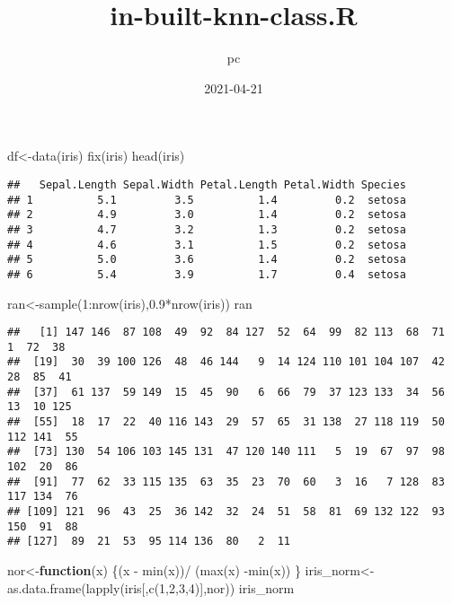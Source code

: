 \documentclass[
]{article}
\title{in-built-knn-class.R}
\author{pc}
\date{2021-04-21}
\newenvironment{Shaded}{\begin{snugshade}}{\end{snugshade}}
\newcommand{\ControlFlowTok}[1]{\textcolor[rgb]{0.13,0.29,0.53}{\textbf{#1}}}
\newcommand{\DecValTok}[1]{\textcolor[rgb]{0.00,0.00,0.81}{#1}}
\newcommand{\FloatTok}[1]{\textcolor[rgb]{0.00,0.00,0.81}{#1}}
\newcommand{\FunctionTok}[1]{\textcolor[rgb]{0.00,0.00,0.00}{#1}}
\newcommand{\NormalTok}[1]{#1}
\newcommand{\OtherTok}[1]{\textcolor[rgb]{0.56,0.35,0.01}{#1}}
\newcommand{\SpecialCharTok}[1]{\textcolor[rgb]{0.00,0.00,0.00}{#1}}
\begin{document}
\maketitle

\begin{Shaded}
\begin{Highlighting}[]
\NormalTok{df}\OtherTok{\textless{}{-}}\FunctionTok{data}\NormalTok{(iris)}
\FunctionTok{fix}\NormalTok{(iris)}
\FunctionTok{head}\NormalTok{(iris)}
\end{Highlighting}
\end{Shaded}

\begin{verbatim}
##   Sepal.Length Sepal.Width Petal.Length Petal.Width Species
## 1          5.1         3.5          1.4         0.2  setosa
## 2          4.9         3.0          1.4         0.2  setosa
## 3          4.7         3.2          1.3         0.2  setosa
## 4          4.6         3.1          1.5         0.2  setosa
## 5          5.0         3.6          1.4         0.2  setosa
## 6          5.4         3.9          1.7         0.4  setosa
\end{verbatim}

\begin{Shaded}
\begin{Highlighting}[]
\NormalTok{ran}\OtherTok{\textless{}{-}}\FunctionTok{sample}\NormalTok{(}\DecValTok{1}\SpecialCharTok{:}\FunctionTok{nrow}\NormalTok{(iris),}\FloatTok{0.9}\SpecialCharTok{*}\FunctionTok{nrow}\NormalTok{(iris))}
\NormalTok{ran}
\end{Highlighting}
\end{Shaded}

\begin{verbatim}
##   [1] 147 146  87 108  49  92  84 127  52  64  99  82 113  68  71   1  72  38
##  [19]  30  39 100 126  48  46 144   9  14 124 110 101 104 107  42  28  85  41
##  [37]  61 137  59 149  15  45  90   6  66  79  37 123 133  34  56  13  10 125
##  [55]  18  17  22  40 116 143  29  57  65  31 138  27 118 119  50 112 141  55
##  [73] 130  54 106 103 145 131  47 120 140 111   5  19  67  97  98 102  20  86
##  [91]  77  62  33 115 135  63  35  23  70  60   3  16   7 128  83 117 134  76
## [109] 121  96  43  25  36 142  32  24  51  58  81  69 132 122  93 150  91  88
## [127]  89  21  53  95 114 136  80   2  11
\end{verbatim}

\begin{Shaded}
\begin{Highlighting}[]
\NormalTok{nor}\OtherTok{\textless{}{-}}\ControlFlowTok{function}\NormalTok{(x) \{(x }\SpecialCharTok{{-}} \FunctionTok{min}\NormalTok{(x))}\SpecialCharTok{/}\NormalTok{ (}\FunctionTok{max}\NormalTok{(x) }\SpecialCharTok{{-}}\FunctionTok{min}\NormalTok{(x)) \}}
\NormalTok{iris\_norm}\OtherTok{\textless{}{-}}\FunctionTok{as.data.frame}\NormalTok{(}\FunctionTok{lapply}\NormalTok{(iris[,}\FunctionTok{c}\NormalTok{(}\DecValTok{1}\NormalTok{,}\DecValTok{2}\NormalTok{,}\DecValTok{3}\NormalTok{,}\DecValTok{4}\NormalTok{)],nor))}
\NormalTok{iris\_norm}
\end{Highlighting}
\end{Shaded}
\end{document}
